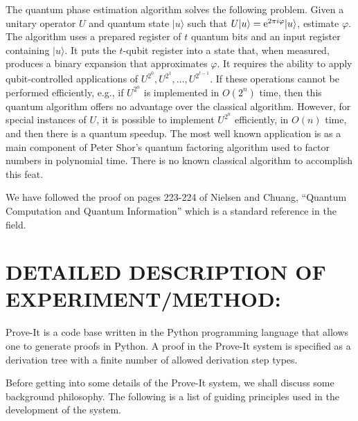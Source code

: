 \documentclass{article}[12pt]
\begin{document}
The quantum phase estimation algorithm solves the following problem.  Given a unitary operator $U$ and quantum state $\lvert u \rangle$ such that $U \lvert u \rangle = {\rm e}^{2 \pi i \varphi} \lvert u \rangle$, estimate $\varphi$. The algorithm uses a prepared register of $t$ quantum bits and an input register containing $\lvert u \rangle$.  It puts the $t$-qubit register into a state that, when measured, produces a binary expansion that approximates $\varphi$.  It requires the ability to apply qubit-controlled applications of $U^{2^0},U^{2^1},...,U^{2^{t-1}}$.  If these operations cannot be performed efficiently, e.g., if $U^{2^n}$ is implemented in $O(2^n)$ time, then this quantum algorithm offers no advantage over the classical algorithm.  However, for special instances of $U$, it is possible to implement $U^{2^n}$ efficiently, in $O(n)$ time, and then there is a quantum speedup.  The most well known application is as a main component of Peter Shor’s quantum factoring algorithm used to factor numbers in polynomial time.  There is no known classical algorithm to accomplish this feat.

We have followed the proof on pages 223-224 of Nielsen and Chuang, “Quantum Computation and Quantum Information” which is a standard reference in the field.
        

\section*{DETAILED DESCRIPTION OF EXPERIMENT/METHOD:}

Prove-It is a code base written in the Python programming language that allows one to generate proofs in Python.  A proof in the Prove-It system is specified as a derivation tree with a finite number of allowed derivation step types.

Before getting into some details of the Prove-It system, we shall discuss some background philosophy.  The following is a list of guiding principles used in the development of the system.
\end{document}
